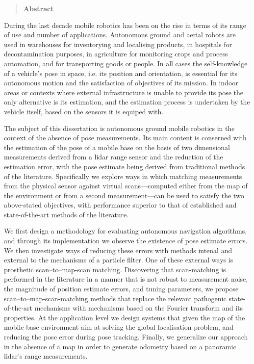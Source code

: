 \newpage

\begin{quotation}
\begin{center}
\textbf{Abstract}
\end{center}
\noindent
\end{quotation}

During the last decade mobile robotics has been on the rise in terms of its
range of use and number of applications. Autonomous ground and aerial robots
are used in warehouses for inventorying and localising products, in hospitals
for decontamination purposes, in agriculture for monitoring crops and process
automation, and for transporting goods or people. In all cases the
self-knowledge of a vehicle's pose in space, i.e. its position and orientation,
is essential for its autonomous motion and the satisfaction of objectives of
its mission. In indoor areas or contexts where external infrastructure is
unable to provide its pose the only alternative is its estimation, and the
estimation process is undertaken by the vehicle itself, based on the sensors it
is equiped with.

The subject of this dissertation is autonomous ground mobile robotics in the
context of the absence of pose measurements. Its main content is conserned with
the estimation of the pose of a mobile base on the basis of two dimensional
measurements derived from a lidar range sensor and the reduction of the
estimation error, with the pose estimate being derived from traditional methods
of the literature. Specifically we explore ways in which matching measurements
from the physical sensor against virtual scans---computed either from the map
of the environment or from a second measurement---can be used to satisfy the
two above-stated objectives, with performance superior to that of established
and state-of-the-art methods of the literature.

We first design a methodology for evaluating autonomous navigation algorithms,
and through its implementation we observe the existence of pose estimate
errors. We then investigate ways of reducing these errors with methods intenal
and external to the mechanisms of a particle filter. One of these external ways
is prosthetic scan--to--map-scan matching. Discovering that scan-matching is
performed in the literature in a manner that is not robust to measurement
noise, the magnitude of position estimate errors, and tuning parameters, we
propose scan--to--map-scan-matching methods that replace the relevant
pathogenic state-of-the-art mechanisms with mechanisms based on the Fourier
transform and its properties. At the application level we design systems that
given the map of the mobile base environment aim at solving the global
localisation problem, and reducing the pose error during pose tracking.
Finally, we generalize our approach in the absence of a map in order to
generate odometry based on a panoramic lidar's range measurements.


\restoregeometry
\doublespace

